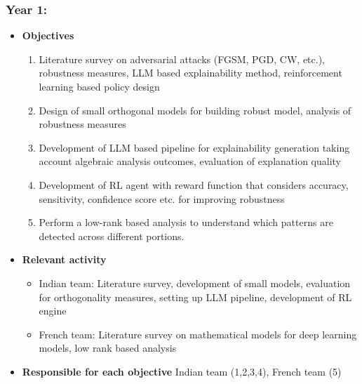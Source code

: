 \documentclass[a4paper,11pt]{article}
\begin{document}
\subsubsection*{Year 1:}
\begin{itemize}
	\item \textbf{Objectives}
	\begin{enumerate}
		\item Literature survey on adversarial attacks (FGSM, PGD, CW, etc.), robustness measures, LLM based explainability method, reinforcement learning based policy design
		\item Design of small orthogonal models for building robust model, analysis of robustness measures
		\item Development of LLM based pipeline for explainability generation taking account algebraic analysis outcomes, evaluation of explanation quality
		\item Development of RL agent with reward function that considers accuracy, sensitivity, confidence score etc. for improving robustness
		
		\item Perform a low-rank based analysis to understand which patterns are detected across different portions.
	\end{enumerate}
	\item \textbf{Relevant activity}
	\begin{itemize}
		\item Indian team: Literature survey, development of small models, evaluation for orthogonality measures, setting up LLM pipeline, development of RL engine
		\item French team: Literature survey on mathematical models for deep learning models, low rank based analysis
	\end{itemize}
	\item \textbf{Responsible for each objective} Indian team (1,2,3,4), French team (5)
\end{itemize}
\end{document}
